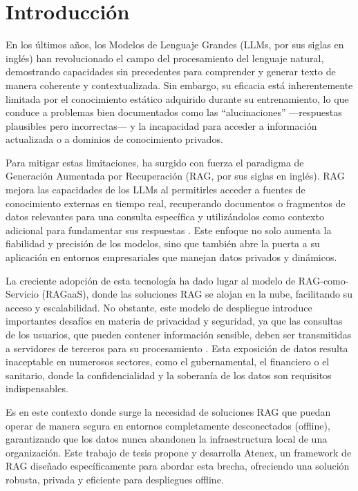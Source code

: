 \chapter{Introducción}

En los últimos años, los Modelos de Lenguaje Grandes (LLMs, por sus siglas en inglés) han revolucionado el campo del procesamiento del lenguaje natural, demostrando capacidades sin precedentes para comprender y generar texto de manera coherente y contextualizada. Sin embargo, su eficacia está inherentemente limitada por el conocimiento estático adquirido durante su entrenamiento, lo que conduce a problemas bien documentados como las ``alucinaciones'' —respuestas plausibles pero incorrectas— y la incapacidad para acceder a información actualizada o a dominios de conocimiento privados.

Para mitigar estas limitaciones, ha surgido con fuerza el paradigma de Generación Aumentada por Recuperación (RAG, por sus siglas en inglés). RAG mejora las capacidades de los LLMs al permitirles acceder a fuentes de conocimiento externas en tiempo real, recuperando documentos o fragmentos de datos relevantes para una consulta específica y utilizándolos como contexto adicional para fundamentar sus respuestas \cite{Gan2025RAGEvaluationSurvey}. Este enfoque no solo aumenta la fiabilidad y precisión de los modelos, sino que también abre la puerta a su aplicación en entornos empresariales que manejan datos privados y dinámicos.

La creciente adopción de esta tecnología ha dado lugar al modelo de RAG-como-Servicio (RAGaaS), donde las soluciones RAG se alojan en la nube, facilitando su acceso y escalabilidad. No obstante, este modelo de despliegue introduce importantes desafíos en materia de privacidad y seguridad, ya que las consultas de los usuarios, que pueden contener información sensible, deben ser transmitidas a servidores de terceros para su procesamiento \cite{Cheng2025RemoteRAG}. Esta exposición de datos resulta inaceptable en numerosos sectores, como el gubernamental, el financiero o el sanitario, donde la confidencialidad y la soberanía de los datos son requisitos indispensables.

Es en este contexto donde surge la necesidad de soluciones RAG que puedan operar de manera segura en entornos completamente desconectados (offline), garantizando que los datos nunca abandonen la infraestructura local de una organización. Este trabajo de tesis propone y desarrolla Atenex, un framework de RAG diseñado específicamente para abordar esta brecha, ofreciendo una solución robusta, privada y eficiente para despliegues offline.


